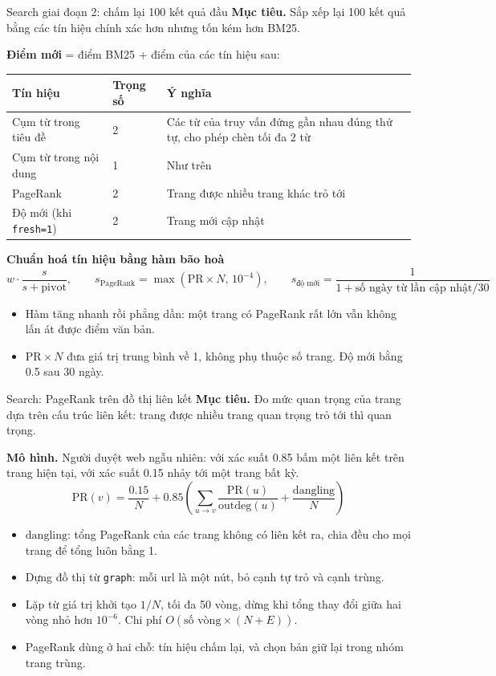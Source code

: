 \documentclass[aspectratio=169,t,10pt]{beamer}
\newcommand{\code}[1]{\texttt{#1}}
\newcommand{\muctieu}[1]{\noindent\textbf{Mục tiêu.} #1\par\vspace{4pt}}
\begin{document}
\begin{frame}[shrink]{Search giai đoạn 2: chấm lại 100 kết quả đầu}
\small
\muctieu{Sắp xếp lại 100 kết quả bằng các tín hiệu chính xác hơn nhưng tốn kém hơn BM25.}
\textbf{Điểm mới} = điểm BM25 + điểm của các tín hiệu sau:\par\vspace{2pt}
\footnotesize
\renewcommand{\arraystretch}{1.3}
\begin{tabularx}{\textwidth}{@{}P{3.6cm}Q{1.5cm}Y@{}}
\toprule
\textbf{Tín hiệu} & \textbf{Trọng số} & \textbf{Ý nghĩa}\\
\midrule
Cụm từ trong tiêu đề & 2 & Các từ của truy vấn đứng gần nhau đúng thứ tự, cho phép chèn tối đa 2 từ\\
Cụm từ trong nội dung & 1 & Như trên\\
PageRank & 2 & Trang được nhiều trang khác trỏ tới\\
Độ mới (khi \code{fresh=1}) & 2 & Trang mới cập nhật\\
\bottomrule
\end{tabularx}
\small
\vspace{4pt}
\textbf{Chuẩn hoá tín hiệu bằng hàm bão hoà}
$$w\cdot\frac{s}{s+\mathrm{pivot}}, \qquad s_{\text{PageRank}}=\max(\mathrm{PR}\times N,\,10^{-4}), \qquad s_{\text{độ mới}}=\frac{1}{1+\text{số ngày từ lần cập nhật}/30}$$
\begin{itemize}
  \item Hàm tăng nhanh rồi phẳng dần: một trang có PageRank rất lớn vẫn không lấn át được điểm văn bản.
  \item $\mathrm{PR}\times N$ đưa giá trị trung bình về 1, không phụ thuộc số trang. Độ mới bằng 0.5 sau 30 ngày.
\end{itemize}
\end{frame}

\begin{frame}{Search: PageRank trên đồ thị liên kết}
\small
\muctieu{Đo mức quan trọng của trang dựa trên cấu trúc liên kết: trang được nhiều trang quan trọng trỏ tới thì quan trọng.}
\textbf{Mô hình.} Người duyệt web ngẫu nhiên: với xác suất 0.85 bấm một liên kết trên trang hiện tại, với xác suất 0.15 nhảy tới một trang bất kỳ.
$$\mathrm{PR}(v)=\frac{0.15}{N}+0.85\left(\sum_{u\to v}\frac{\mathrm{PR}(u)}{\mathrm{outdeg}(u)}+\frac{\mathrm{dangling}}{N}\right)$$
\begin{itemize}
  \item $\mathrm{dangling}$: tổng PageRank của các trang không có liên kết ra, chia đều cho mọi trang để tổng luôn bằng 1.
  \item Dựng đồ thị từ \code{graph}: mỗi url là một nút, bỏ cạnh tự trỏ và cạnh trùng.
  \item Lặp từ giá trị khởi tạo $1/N$, tối đa 50 vòng, dừng khi tổng thay đổi giữa hai vòng nhỏ hơn $10^{-6}$. Chi phí $O(\text{số vòng}\times(N+E))$.
  \item PageRank dùng ở hai chỗ: tín hiệu chấm lại, và chọn bản giữ lại trong nhóm trang trùng.
\end{itemize}
\end{frame}
\end{document}
